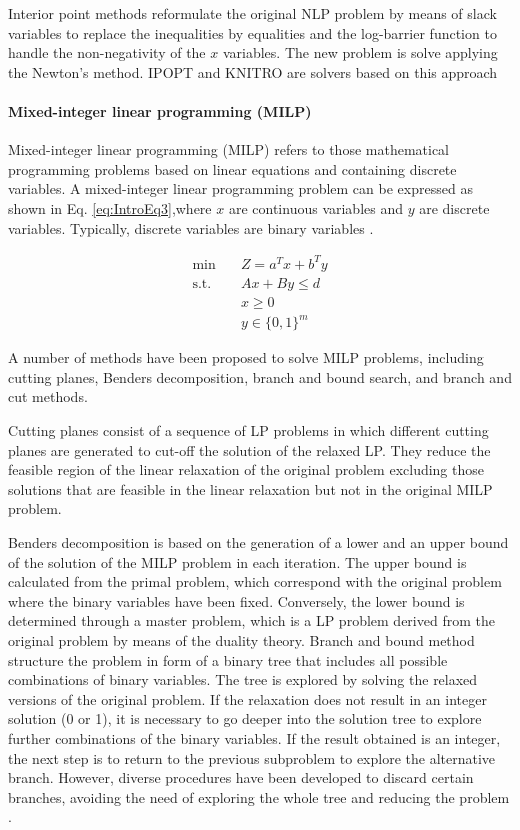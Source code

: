 \begin{refsection}[referencesCh1]
Interior point methods reformulate the original NLP problem by means of slack variables to replace the inequalities by equalities and the log-barrier function to handle the non-negativity of the $x$ variables. The new problem is solve applying the Newton's method. IPOPT \cite{wachter2006implementation} and KNITRO \citep{waltz2004knitro} are solvers based on this approach

\paragraph{Mixed-integer linear programming (MILP)}
Mixed-integer linear programming (MILP) refers to those mathematical programming problems based on linear equations and containing discrete variables. A mixed-integer linear programming problem can be expressed as shown in Eq. \ref{eq:IntroEq3},where $x$ are continuous variables and $y$ are discrete variables. Typically, discrete variables are binary variables \citep{grossmann2021advanced}.

\begin{align}
		\min \quad & Z=a^{T}x + b^{T}y \nonumber\\
		\textrm{s.t.} \quad & Ax+By \leq d \label{eq:IntroEq3}\\
		& x \geq 0 \\
		& y \in \lbrace 0,1 \rbrace ^{m} \nonumber
\end{align}  

A number of methods have been proposed to solve MILP problems, including cutting planes, Benders decomposition, branch and bound search, and branch and cut methods.

Cutting planes consist of a sequence of LP problems in which different cutting planes are generated to cut-off the solution of the relaxed LP. They reduce the feasible region of the linear relaxation of the original problem excluding those solutions that are feasible in the linear relaxation but not in the original MILP problem. 

Benders decomposition is based on the generation of a lower and an upper bound of the solution of the MILP problem in each iteration. The upper bound is calculated from the primal problem, which correspond with the original problem where the binary variables have been fixed. Conversely, the lower bound is determined through a master problem, which is a LP problem derived from the original problem by means of the duality theory. Branch and bound method structure the problem in form of a binary tree that includes all possible combinations of binary variables. The tree is explored by solving the relaxed versions of the original problem.  If the relaxation does not result in an integer solution (0 or 1), it is necessary to go deeper into the solution tree to explore further combinations of the binary variables. If the result obtained is an integer, the next step is to return to the previous subproblem to explore the alternative branch. However, diverse procedures have been developed to discard certain branches, avoiding the need of exploring the whole tree and reducing the problem \citep{floudas1995nonlinear}.


\end{refsection}
